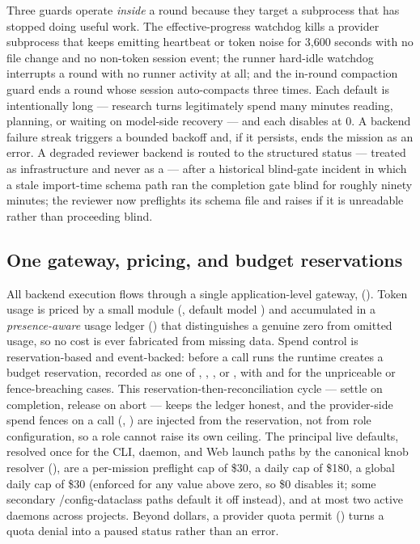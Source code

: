 Three guards operate \emph{inside} a round because they target a subprocess that has
stopped doing useful work. The effective-progress watchdog kills a provider
subprocess that keeps emitting heartbeat or token noise for 3,600 seconds with no
file change and no non-token session event; the runner hard-idle watchdog interrupts
a round with no runner activity at all; and the in-round compaction guard ends a
round whose session auto-compacts three times. Each default is intentionally long ---
research turns legitimately spend many minutes reading, planning, or waiting on
model-side recovery --- and each disables at 0. A backend failure streak triggers a
bounded backoff and, if it persists, ends the mission as an error. A degraded reviewer
backend is routed to the structured  status --- treated as
infrastructure and never as a  --- after a historical blind-gate
incident in which a stale import-time schema path ran the completion gate blind for
roughly ninety minutes; the reviewer now preflights its schema file and raises if it
is unreadable rather than proceeding blind.

\subsection{One gateway, pricing, and budget reservations}

All backend execution flows through a single application-level gateway,
 (). Token usage is priced
by a small module (, default model ) and
accumulated in a \emph{presence-aware} usage ledger () that
distinguishes a genuine zero from omitted usage, so no cost is ever fabricated from
missing data. Spend control is reservation-based and event-backed: before a call runs
the runtime creates a budget reservation, recorded as one of
, , , or
, with  and
 for the unpriceable or fence-breaching cases. This
reservation-then-reconciliation cycle --- settle on completion, release on abort ---
keeps the ledger honest, and the provider-side spend fences on a call
(, ) are injected from the reservation,
not from role configuration, so a role cannot raise its own ceiling. The principal
live defaults, resolved once for the CLI, daemon, and Web launch paths by the
canonical  knob resolver (), are a
per-mission preflight cap of \$30, a daily cap of \$180, a global daily cap of \$30
(enforced for any value above zero, so \$0 disables it; some secondary
/config-dataclass paths default it off instead), and at most two active
daemons across projects. Beyond dollars, a provider quota permit ()
turns a quota denial into a paused status rather than an error.

